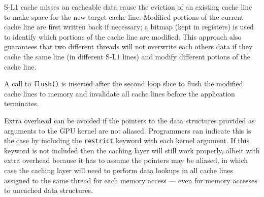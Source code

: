 %

\noindent
S-L1 cache misses on cacheable data cause the eviction of an existing cache
line to make space for the new target cache line. Modified portions of the
current cache line are first written back if necessary; a bitmap (kept in
registers) is used to identify which portions of the cache line are modified.
This approach also guarantees that two different threads will not overwrite each others data if they cache the same line (in different S-L1 lines) and
modify different potions of the cache line.

A call to \texttt{flush()} is inserted after the second loop slice to flush the modified cache lines to memory and invalidate all cache lines before the application terminates.

Extra overhead can be avoided if the pointers to the data structures provided as arguments to the GPU
kernel are not aliased. 
Programmers can indicate this is the case by including the \texttt{restrict} keyword with each
kernel argument. 
If this keyword is not included then the caching layer will still work properly, albeit 
with extra overhead because it has to assume the pointers may be aliased,
in which case the caching layer will need to perform data lookups in all cache lines assigned to the same thread for
each memory access --- even for memory accesses to uncached data structures.



